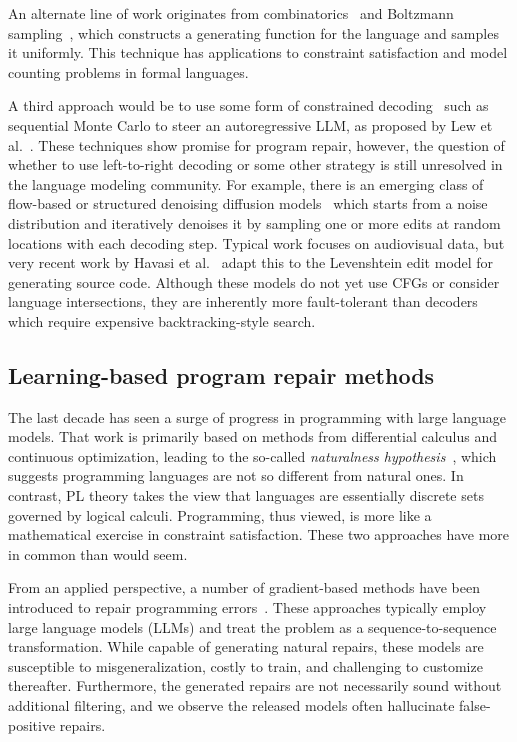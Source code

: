 \documentclass[popl.tex]{subfiles}
\begin{document}
An alternate line of work originates from combinatorics~\cite{hickey1983uniform} and Boltzmann sampling~\cite{duchon2004boltzmann}, which constructs a generating function for the language and samples it uniformly. This technique has applications to constraint satisfaction and model counting problems in formal languages.

A third approach would be to use some form of constrained decoding~\cite{willard2023efficient, ugare2024improving, loula2025syntactic} such as sequential Monte Carlo to steer an autoregressive LLM, as proposed by Lew et al.~\cite{lew2023sequential, lipkin2025fast}. These techniques show promise for program repair, however, the question of whether to use left-to-right decoding or some other strategy is still unresolved in the language modeling community. For example, there is an emerging class of flow-based or structured denoising diffusion models~\cite{austin2021structured} which starts from a noise distribution and iteratively denoises it by sampling one or more edits at random locations with each decoding step. Typical work focuses on audiovisual data, but very recent work by Havasi et al.~\cite{havasi2025edit} adapt this to the Levenshtein edit model for generating source code. Although these models do not yet use CFGs or consider language intersections, they are inherently more fault-tolerant than decoders which require expensive backtracking-style search.

\subsection{Learning-based program repair methods}

The last decade has seen a surge of progress in programming with large language models. That work is primarily based on methods from differential calculus and continuous optimization, leading to the so-called \textit{naturalness hypothesis}~\cite{allamanis2018survey}, which suggests programming languages are not so different from natural ones. In contrast, PL theory takes the view that languages are essentially discrete sets governed by logical calculi. Programming, thus viewed, is more like a mathematical exercise in constraint satisfaction. These two approaches have more in common than would seem.

From an applied perspective, a number of gradient-based methods have been introduced to repair programming errors~\cite{allamanis2021self, chirkova2021empirical, drain2021generating}. These approaches typically employ large language models (LLMs) and treat the problem as a sequence-to-sequence transformation. While capable of generating natural repairs, these models are susceptible to misgeneralization, costly to train, and challenging to customize thereafter. Furthermore, the generated repairs are not necessarily sound without additional filtering, and we observe the released models often hallucinate false-positive repairs.
\end{document}
